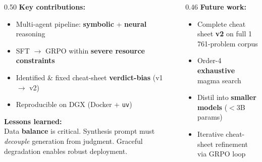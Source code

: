 \documentclass[aspectratio=169,10pt]{beamer}
\newcommand{\cy}[1]{\textcolor{AccentBlue}{\textbf{#1}}}
\newcommand{\gd}[1]{\textcolor{AccentGold}{\textbf{#1}}}
\begin{document}
{\begin{frame}[plain]
\vspace{20mm}
\begin{columns}[T,onlytextwidth]
  \begin{column}{0.50\textwidth}
    \cy{Key contributions:}
    \vspace{2mm}
    \begin{itemize}\setlength\itemsep{3pt}
      \item[\textcolor{AccentGreen}{$\checkmark$}]
        Multi-agent pipeline: \textbf{symbolic} + \textbf{neural} reasoning
      \item[\textcolor{AccentGreen}{$\checkmark$}]
        SFT $\to$ GRPO within \textbf{severe resource constraints}
      \item[\textcolor{AccentGreen}{$\checkmark$}]
        Identified \& fixed cheat-sheet \textbf{verdict-bias} (v1 $\to$ v2)
      \item[\textcolor{AccentGreen}{$\checkmark$}]
        Reproducible on DGX (Docker + \texttt{uv})
    \end{itemize}
    \vspace{3mm}
    \cy{Lessons learned:}\\[2pt]
    \scriptsize Data \textbf{balance} is critical. Synthesis prompt must
    \textit{decouple} generation from judgment.
    Graceful degradation enables robust deployment.
  \end{column}
  \hfill
  \begin{column}{0.46\textwidth}
    \gd{Future work:}
    \vspace{2mm}
    \begin{itemize}\setlength\itemsep{3pt}
      \item[\textcolor{AccentGold}{$\triangleright$}]
        Complete cheat sheet \textbf{v2} on full 1\,761-problem corpus
      \item[\textcolor{AccentGold}{$\triangleright$}]
        Order-4 \textbf{exhaustive} magma search
      \item[\textcolor{AccentGold}{$\triangleright$}]
        Distil into \textbf{smaller models} ($<$3B params)
      \item[\textcolor{AccentGold}{$\triangleright$}]
        Iterative cheat-sheet refinement via GRPO loop
    \end{itemize}
    \vspace{3mm}

\end{column}
\end{columns}
\end{frame}}
\end{document}
